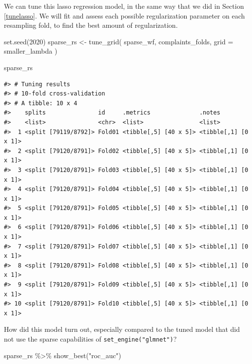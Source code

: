 \documentclass[
]{krantz}
\makeatletter
\newenvironment{Shaded}{\begin{snugshade}}{\end{snugshade}}
\newcommand{\AttributeTok}[1]{\textcolor[rgb]{0.77,0.63,0.00}{#1}}
\newcommand{\DecValTok}[1]{\textcolor[rgb]{0.00,0.00,0.81}{#1}}
\newcommand{\FunctionTok}[1]{\textcolor[rgb]{0.00,0.00,0.00}{#1}}
\newcommand{\NormalTok}[1]{#1}
\newcommand{\OtherTok}[1]{\textcolor[rgb]{0.56,0.35,0.01}{#1}}
\newcommand{\SpecialCharTok}[1]{\textcolor[rgb]{0.00,0.00,0.00}{#1}}
\newcommand{\StringTok}[1]{\textcolor[rgb]{0.31,0.60,0.02}{#1}}
\newenvironment{kframe}{%
\medskip{}
\setlength{\fboxsep}{.8em}
 \def\at@end@of@kframe{}%
 \ifinner\ifhmode%
  \def\at@end@of@kframe{\end{minipage}}%
  \begin{minipage}{\columnwidth}%
 \fi\fi%
 \def\FrameCommand##1{\hskip\@totalleftmargin \hskip-\fboxsep
 \colorbox{shadecolor}{##1}\hskip-\fboxsep
     \hskip-\linewidth \hskip-\@totalleftmargin \hskip\columnwidth}%
 \MakeFramed {\advance\hsize-\width
   \@totalleftmargin\z@ \linewidth\hsize
   \@setminipage}}%
 {\par\unskip\endMakeFramed%
 \at@end@of@kframe}
\renewenvironment{Shaded}{\begin{kframe}}{\end{kframe}}
\makeatother
\begin{document}
We can tune this lasso regression model, in the same way that we did in Section \ref{tunelasso}. We will fit and assess each possible regularization parameter on each resampling fold, to find the best amount of regularization.

\begin{Shaded}
\begin{Highlighting}[]
\FunctionTok{set.seed}\NormalTok{(}\DecValTok{2020}\NormalTok{)}
\NormalTok{sparse\_rs }\OtherTok{\textless{}{-}} \FunctionTok{tune\_grid}\NormalTok{(}
\NormalTok{  sparse\_wf,}
\NormalTok{  complaints\_folds,}
  \AttributeTok{grid =}\NormalTok{ smaller\_lambda}
\NormalTok{)}

\NormalTok{sparse\_rs}
\end{Highlighting}
\end{Shaded}

\begin{verbatim}
#> # Tuning results
#> # 10-fold cross-validation 
#> # A tibble: 10 x 4
#>    splits               id     .metrics              .notes              
#>    <list>               <chr>  <list>                <list>              
#>  1 <split [79119/8792]> Fold01 <tibble[,5] [40 x 5]> <tibble[,1] [0 x 1]>
#>  2 <split [79120/8791]> Fold02 <tibble[,5] [40 x 5]> <tibble[,1] [0 x 1]>
#>  3 <split [79120/8791]> Fold03 <tibble[,5] [40 x 5]> <tibble[,1] [0 x 1]>
#>  4 <split [79120/8791]> Fold04 <tibble[,5] [40 x 5]> <tibble[,1] [0 x 1]>
#>  5 <split [79120/8791]> Fold05 <tibble[,5] [40 x 5]> <tibble[,1] [0 x 1]>
#>  6 <split [79120/8791]> Fold06 <tibble[,5] [40 x 5]> <tibble[,1] [0 x 1]>
#>  7 <split [79120/8791]> Fold07 <tibble[,5] [40 x 5]> <tibble[,1] [0 x 1]>
#>  8 <split [79120/8791]> Fold08 <tibble[,5] [40 x 5]> <tibble[,1] [0 x 1]>
#>  9 <split [79120/8791]> Fold09 <tibble[,5] [40 x 5]> <tibble[,1] [0 x 1]>
#> 10 <split [79120/8791]> Fold10 <tibble[,5] [40 x 5]> <tibble[,1] [0 x 1]>
\end{verbatim}

How did this model turn out, especially compared to the tuned model that did not use the sparse capabilities of \texttt{set\_engine("glmnet")}?

\begin{Shaded}
\begin{Highlighting}[]
\NormalTok{sparse\_rs }\SpecialCharTok{\%\textgreater{}\%}
  \FunctionTok{show\_best}\NormalTok{(}\StringTok{"roc\_auc"}\NormalTok{)}
\end{Highlighting}
\end{Shaded}
\end{document}
